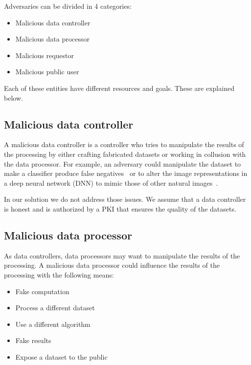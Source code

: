 Adversaries can be divided in 4 categories:

\begin{itemize}
  \item Malicious data controller
  \item Malicious data processor
  \item Malicious requestor
  \item Malicious public user
\end{itemize}

Each of these entities have different resources and goals. These are explained below.

\subsection{Malicious data controller}
\label{solution:treat_model:mcontroller}

A malicious data controller is a controller who tries to manipulate the results of the processing by either crafting fabricated datasets or working in collusion with the data processor. For example, an adversary could manipulate the dataset to make a classifier produce false negatives~\cite{dalvi2004adversarial} or to alter the image representations in a deep neural network (DNN) to mimic those of other natural images~\cite{sabour2015adversarial}.

In our solution we do not address those issues. We assume that a data controller is honest and is authorized by a PKI that ensures the quality of the datasets.

\subsection{Malicious data processor}
\label{solution:treat_model:mprocessor}

As data controllers, data processors may want to manipulate the results of the processing. A malicious data processor could influence the results of the processing with the following means:

\begin{itemize}
  \item Fake computation
  \item Process a different dataset
  \item Use a different algorithm
  \item Fake results
  \item Expose a dataset to the public
\end{itemize}

